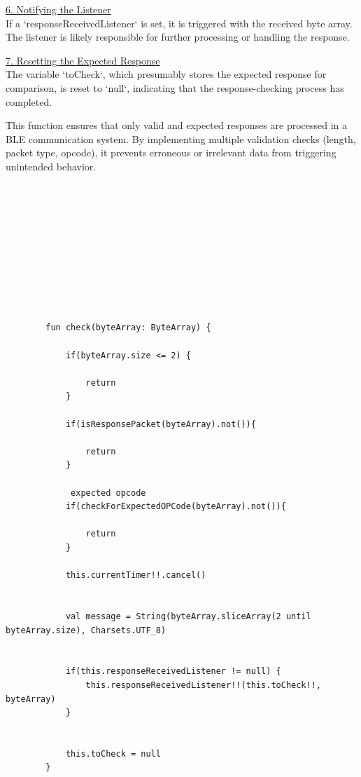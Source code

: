 {{	\underline{6. Notifying the Listener}\mbox{}\\
	If a `responseReceivedListener` is set, it is triggered with the received byte array. The listener is likely responsible for further processing or handling the response.  
	
	\underline{7. Resetting the Expected Response }\mbox{}\\
	The variable `toCheck`, which presumably stores the expected response for comparison, is reset to `null`, indicating that the response-checking process has completed.  
	
	This function ensures that only valid and expected responses are processed in a BLE communication system. By implementing multiple validation checks (length, packet type, opcode), it prevents erroneous or irrelevant data from triggering unintended behavior. 
	\mbox{}\\
	\mbox{}\\
	\mbox{}\\
	\mbox{}\\
	\mbox{}\\
	\mbox{}\\
	\mbox{}\\
	\mbox{}\\
	\mbox{}\\
	\mbox{}\\
	\begin{lstlisting}[label={fig:simpleSourceGen.cs}, caption={Code to validate packages}]
		
		fun check(byteArray: ByteArray) {
			
			if(byteArray.size <= 2) {
				
				return
			}
			
			if(isResponsePacket(byteArray).not()){
				
				return
			}
			
			 expected opcode
			if(checkForExpectedOPCode(byteArray).not()){
			
				return
			}
			
			this.currentTimer!!.cancel()
			
			
			val message = String(byteArray.sliceArray(2 until byteArray.size), Charsets.UTF_8)
			
			
			if(this.responseReceivedListener != null) {
				this.responseReceivedListener!!(this.toCheck!!, byteArray)
			}
			
			
			this.toCheck = null
		}
		
	\end{lstlisting}
	
}}
